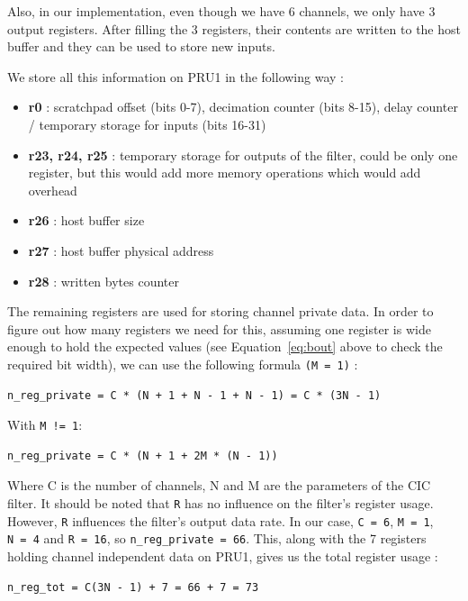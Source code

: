 \documentclass[]{report}
\providecommand{\tightlist}{%
	\setlength{\itemsep}{0pt}\setlength{\parskip}{0pt}}
\begin{document}
Also, in our implementation, even though we have 6 channels, we only have 3 output registers. After filling the 3 registers, their contents are written to the host buffer and they can be used to store new inputs.

We store all this information on PRU1 in the following way :

\begin{itemize}
\tightlist
\item
  \textbf{r0} : scratchpad offset (bits 0-7), decimation counter (bits
  8-15), delay counter / temporary storage for inputs (bits 16-31)
\item
  \textbf{r23, r24, r25} : temporary storage for outputs of the filter,
  could be only one register, but this would add more memory operations
  which would add overhead
\item
  \textbf{r26} : host buffer size
\item
  \textbf{r27} : host buffer physical address
\item
  \textbf{r28} : written bytes counter
\end{itemize}

The remaining registers are used for storing channel private data. In order to figure out how many registers we need for this, assuming one register is wide enough to hold the expected values (see Equation~\ref{eq:bout} above to check the required bit width), we can use the following formula \texttt{(M = 1)} :

\begin{verbatim}
n_reg_private = C * (N + 1 + N - 1 + N - 1) = C * (3N - 1)
\end{verbatim}

With \texttt{M\ !=\ 1}:

\begin{verbatim}
n_reg_private = C * (N + 1 + 2M * (N - 1))
\end{verbatim}

Where C is the number of channels, N and M are the parameters of the CIC
filter. It should be noted that \texttt{R} has no influence on the
filter's register usage. However, \texttt{R} influences the filter's
output data rate. In our case, \texttt{C\ =\ 6}, \texttt{M\ =\ 1},
\texttt{N\ =\ 4} and \texttt{R\ =\ 16}, so
\texttt{n\_reg\_private\ =\ 66}. This, along with the 7 registers holding channel independent data on
PRU1, gives us the total register usage :

\begin{verbatim}
n_reg_tot = C(3N - 1) + 7 = 66 + 7 = 73
\end{verbatim}
\end{document}
